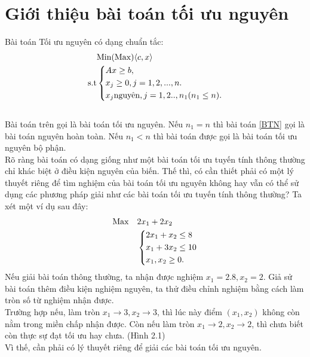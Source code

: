\documentclass[12pt,a4paper]{report}
\begin{document}
\section{Giới thiệu bài toán tối ưu nguyên}
Bài toán Tối ưu nguyên có dạng chuẩn tắc:\\
    \begin{equation}\label{BTN}
     \begin{split}
          & {\rm{Min (Max)}} \langle c,x \rangle\\
          \rm{s.t} &\left\{\begin{split}
            & Ax\ge b,\\
            & x_j \ge 0, j=1,2,...,n.\\
            & x_j \text{nguyên}, j=1,2..,n_1 (n_1\le n).\\
           \end{split}\right.
       \end{split}
   \end{equation}
   \\
   
 Bài toán trên gọi là bài toán tối ưu nguyên. Nếu $n_1=n$ thì bài toán \eqref{BTN} gọi là bài toán nguyên hoàn toàn. Nếu $n_1 <n$ thì bài toán được gọi là bài toán tối ưu nguyên bộ phận.\\
Rõ ràng bài toán có dạng giống như một bài toán tối ưu tuyến tính thông thường chỉ khác biệt ở điều kiện nguyên của biến. Thế thì, có cần thiết phải có một lý thuyết riêng để tìm nghiệm của bài toán tối ưu nguyên không hay vẫn có thể sử dụng các phương pháp giải như các bài toán tối ưu tuyến tính thông thường? Ta xét một ví dụ sau đây:\\

\begin{equation*}
    \begin{split}
      \rm{Max} \quad & 2x_1+2x_2 \\
      &\left\{\begin{split}
          &2x_1+x_2 \le 8\\
          & x_1+3x_2 \le 10\\
          & x_1,x_2 \ge 0.\\
      \end{split}\right.
    \end{split}
\end{equation*}
Nếu giải bài toán thông thường, ta nhận được nghiệm $x_1=2.8,x_2=2$. Giả sử bài toán thêm điều kiện nghiệm nguyên, ta thử điều chỉnh nghiệm bằng cách làm tròn số từ nghiệm nhận được.\\
Trường hợp nếu, làm tròn $x_1 \to 3, x_2 \to 3$, thì lúc này điểm $(x_1,x_2)$ không còn nằm trong miền chấp nhận được. Còn nếu làm tròn $x_1 \to 2, x_2 \to 2$, thì chưa biết còn thực sự đạt tối ưu hay chưa. (Hình 2.1)\\
Vì thế, cần phải có lý thuyết riêng để giải các bài toán tối ưu nguyên.
\end{document}
